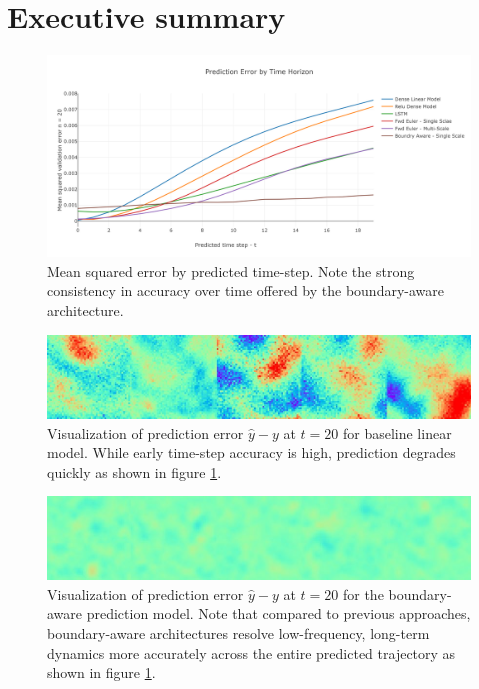 \documentclass[12pt]{article}
\theoremstyle{plain}
\theoremstyle{remark}
\theoremstyle{definition}
\begin{document}


\section{Executive summary}

\begin{figure}
	\centering
	\includegraphics[width=0.95\linewidth]{performance_boundry_aware}
	\caption{\small Mean squared error by predicted time-step. Note the strong consistency in accuracy over time offered by the boundary-aware architecture.}
	\label{fig:perf_over_time}
\end{figure}	



\begin{figure}
	\centering
	\includegraphics[width=0.95\linewidth]{low_frequency_noise}
	\caption{\small Visualization of prediction error $\hat{y} - y$ at $t=20$ for baseline linear model. While early time-step accuracy is high, prediction degrades quickly as shown in figure \ref{fig:perf_over_time}. }
	\label{fig:low_frequency_noise}
\end{figure}

\begin{figure}
	\centering
	\includegraphics[width=0.95\linewidth]{high_frequency_noise}
	\caption{\small Visualization of prediction error $\hat{y} - y$ at $t=20$ for the boundary-aware prediction model. Note that compared to previous approaches, boundary-aware architectures resolve low-frequency, long-term dynamics more accurately across the entire predicted trajectory as shown in figure \ref{fig:perf_over_time}. }
	\label{fig:high_frequency_noise}
\end{figure}	
\end{document}
